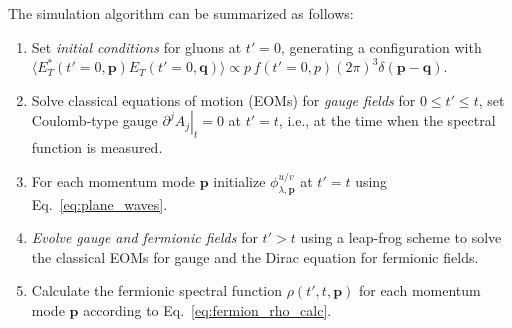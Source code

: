 \documentclass[]{webofc}
\newcommand{\mbf}{\mathbf}
\newcommand{\tpert}{t}
\newcommand{\eq}{Eq.~}
\newcommand{\re}{Ref.~}
\begin{document}
The simulation algorithm can be summarized as follows:

\begin{enumerate}
   
   \item Set {\em initial conditions} for gluons at $t' = 0$, generating a configuration with
   $\langle E_T^*(t'{=}0,\mbf p) E_T(t'{=}0,\mbf q) \rangle \propto p\,f(t'{=}0,p) (2\pi)^3\delta(\mbf p - \mbf q)$.
   
   \item Solve classical equations of motion (EOMs) for {\em gauge fields} for $0 \leq t' \leq \tpert$, set Coulomb-type gauge $\left. \partial^j A_j\right|_{\tpert} = 0$ at $t' = \tpert$, i.e., at the time when the spectral function is measured.
   
   \item For each momentum mode $\mbf p$ initialize $\phi_{\lambda,\mbf p}^{u/v}$ at $t' = \tpert$ using \eq\eqref{eq:plane_waves}.
   
  \item {\em Evolve gauge and fermionic fields} for $t' > t$ using a leap-frog scheme to solve the classical EOMs for gauge and the Dirac equation for fermionic fields.
  
  \item Calculate the fermionic spectral function $\rho(t',\tpert,\mbf p)$ for each momentum mode $\mbf p$ according to \eq\eqref{eq:fermion_rho_calc}.
  
\end{enumerate}


\end{document}
